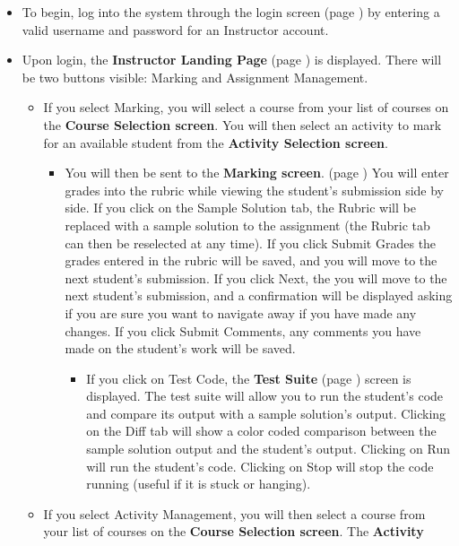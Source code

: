 \documentclass{article}
\begin{document}
\begin{itemize}
  \item To begin, log into the system through the login screen (page \pageref{login})
    by entering a valid username and password for an Instructor account.
  \item Upon login, the \textbf{Instructor Landing Page} (page \pageref{landPg}) 
    is displayed. There will be two buttons visible: Marking and Assignment 
    Management.
    \begin{itemize}
      \item If you select Marking, you will select a course from your list of courses
        on the \textbf{Course Selection screen}. You will then select an activity
        to mark for an available student from the \textbf{Activity Selection screen}.
        \begin{itemize}
        \item You will then be sent to the \textbf{Marking screen}. (page
	  \pageref{marking}) You will enter grades into the rubric while viewing 
	  the student's submission side by side. If you click on the Sample Solution 
	  tab, the Rubric will be replaced with a sample solution to the assignment 
	  (the Rubric tab can then be reselected at any time). If you click Submit 
	  Grades the grades entered in the rubric will be saved, and you will 
	  move to the next student's submission. If you click Next, the you will 
	  move to the next student's submission, and a confirmation will be displayed 
	  asking if you are sure you want to navigate away if you have made any 
	  changes. If you click Submit Comments, any comments you have made 
	  on the student's work will be saved.
	  \begin{itemize}
	    \item If you click on Test Code, the \textbf{Test Suite} (page 
	      \pageref{testSuite}) screen is displayed. The test suite will allow you 
	      to run the student's code and compare its output with a sample 
	      solution's output. Clicking on the Diff tab will show a color coded 
	      comparison between the sample solution output and the student's 
	      output. Clicking on Run will run the student's code. Clicking on Stop 
	      will stop the code running (useful if it is stuck or hanging).
	  \end{itemize}
	\end{itemize}
      \item If you select Activity Management, you will then select a course from your
	list of courses on the \textbf{Course Selection screen}. The \textbf{Activity 
}
\end{itemize}
\end{itemize}
\end{document}
